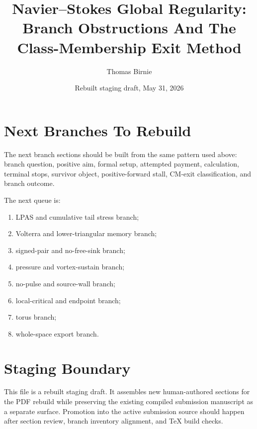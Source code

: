 \documentclass[11pt]{article}
\title{Navier--Stokes Global Regularity: Branch Obstructions And The Class-Membership Exit Method}
\author{Thomas Birnie}
\date{Rebuilt staging draft, May 31, 2026}
\begin{document}
\maketitle



\setcounter{tocdepth}{1}
\tableofcontents
\clearpage












\section{Next Branches To Rebuild}
\label{sec:next-branches-to-rebuild}

The next branch sections should be built from the same pattern used above:
branch question, positive aim, formal setup, attempted payment, calculation,
terminal stops, survivor object, positive-forward stall, CM-exit classification,
and branch outcome.

The next queue is:

\begin{enumerate}[leftmargin=*]
\item LPAS and cumulative tail stress branch;
\item Volterra and lower-triangular memory branch;
\item signed-pair and no-free-sink branch;
\item pressure and vortex-sustain branch;
\item no-pulse and source-wall branch;
\item local-critical and endpoint branch;
\item torus branch;
\item whole-space export branch.
\end{enumerate}

\section{Staging Boundary}
\label{sec:staging-boundary}

This file is a rebuilt staging draft. It assembles new human-authored sections
for the PDF rebuild while preserving the existing compiled submission manuscript
as a separate surface. Promotion into the active submission source should happen
after section review, branch inventory alignment, and TeX build checks.
\end{document}
